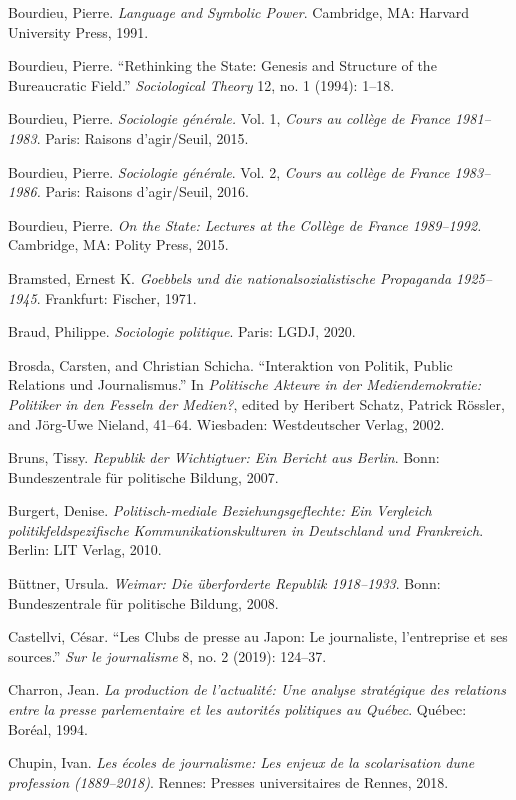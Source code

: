 \documentclass{tufte-handout}
\begin{document}
\begin{hangparas}{.25in}{1}
Bourdieu, Pierre. \emph{Language and Symbolic Power}. Cambridge, MA:
Harvard University Press, 1991.

Bourdieu, Pierre. ``Rethinking the State: Genesis and Structure of the
Bureaucratic Field.'' \emph{Sociological Theory} 12, no. 1 (1994):
1--18.

Bourdieu, Pierre. \emph{Sociologie générale.} Vol. 1, \emph{Cours au
collège de France 1981--1983}. Paris: Raisons d'agir/Seuil, 2015.

Bourdieu, Pierre. \emph{Sociologie générale}. Vol. 2, \emph{Cours au
collège de France 1983--1986.} Paris: Raisons d'agir/Seuil, 2016.

Bourdieu, Pierre. \emph{On the State: Lectures at the Collège de France
1989--1992.} Cambridge, MA: Polity Press, 2015.

Bramsted, Ernest K. \emph{Goebbels und die nationalsozialistische
Propaganda 1925--1945}. Frankfurt: Fischer, 1971.

Braud, Philippe. \emph{Sociologie politique}. Paris: LGDJ, 2020.

Brosda, Carsten, and Christian Schicha. ``Interaktion von Politik,
Public Relations und Journalismus.'' In \emph{Politische Akteure in der
Mediendemokratie: Politiker in den Fesseln der Medien?}, edited by
Heribert Schatz, Patrick Rössler, and Jörg-Uwe Nieland, 41--64.
Wiesbaden: Westdeutscher Verlag, 2002.

Bruns, Tissy. \emph{Republik der Wichtigtuer: Ein Bericht aus Berlin}.
Bonn: Bundeszentrale für politische Bildung, 2007.

Burgert, Denise. \emph{Politisch-mediale Beziehungsgeflechte: Ein
Vergleich politikfeldspezifische Kommunikationskulturen in Deutschland
und Frankreich}. Berlin: LIT Verlag, 2010.

Büttner, Ursula. \emph{Weimar: Die überforderte Republik 1918--1933}.
Bonn: Bundeszentrale für politische Bildung, 2008.

Castellvi, César. ``Les Clubs de presse au Japon: Le journaliste,
l'entreprise et ses sources.'' \emph{Sur le journalisme} 8, no. 2
(2019): 124--37.

Charron, Jean. \emph{La production de l'actualité: Une analyse
stratégique des relations entre la presse parlementaire et les autorités
politiques au Québec}. Québec: Boréal, 1994.

Chupin, Ivan. \emph{Les écoles de journalisme: Les enjeux de la
scolarisation d\textquotesingle une profession (1889--2018)}. Rennes:
Presses universitaires de Rennes, 2018.


\end{hangparas}
\end{document}
